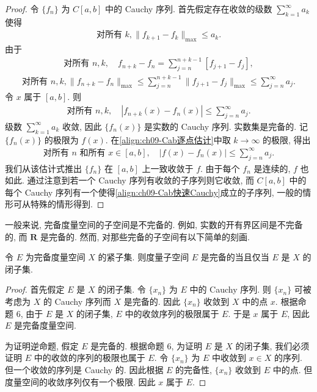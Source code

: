 \documentclass[../../main.tex]{subfiles}
\begin{document}
\begin{proof}
令 $\{f_{n}\}$ 为 $C[a,b]$ 中的 Cauchy 序列. 首先假定存在收敛的级数 $\sum_{k=1}^{\infty}a_{k}$ 使得
\begin{align}
\text{对所有 }k,\|f_{k+1}-f_{k}\|_{\max}\leqslant a_{k}.\label{align:ch09-Cab快速Cauchy}
\end{align}
由于
\begin{align*}
\text{对所有 }n,k,\quad f_{n+k}-f_{n}=\sum_{j=n}^{n+k-1}[f_{j+1}-f_{j}],
\end{align*}
\begin{align*}
\text{对所有 }n,k,\|f_{n+k}-f_{n}\|_{\max}\leqslant\sum_{j=n}^{n+k-1}\|f_{j+1}-f_{j}\|_{\max}\leqslant\sum_{j=n}^{\infty}a_{j}.
\end{align*}
令 $x$ 属于 $[a,b]$. 则
\begin{align}
\text{对所有 }n,k,\quad|f_{n+k}(x)-f_{n}(x)|\leqslant\sum_{j=n}^{\infty}a_{j}.\label{align:ch09-Cab逐点估计}
\end{align}
级数 $\sum_{k=1}^{\infty}a_{k}$ 收敛, 因此 $\{f_{n}(x)\}$ 是实数的 Cauchy 序列. 实数集是完备的. 记 $\{f_{n}(x)\}$ 的极限为 $f(x)$. 在\eqref{align:ch09-Cab逐点估计}中取 $k\to\infty$ 的极限, 得出
\begin{align*}
\text{对所有 }n\text{ 和所有 }x\in[a,b],\quad|f(x)-f_{n}(x)|\leqslant\sum_{j=n}^{\infty}a_{j}.
\end{align*}
我们从该估计式推出 $\{f_{n}\}$ 在 $[a,b]$ 上一致收敛于 $f$. 由于每个 $f_{n}$ 是连续的, $f$ 也如此. 通过注意到若一个 Cauchy 序列有收敛的子序列则它收敛, 而 $C[a,b]$ 中的每个 Cauchy 序列有一个使得\eqref{align:ch09-Cab快速Cauchy}成立的子序列, 一般的情形可从特殊的情形得到.
\end{proof}

一般来说, 完备度量空间的子空间是不完备的. 例如, 实数的开有界区间是不完备的, 而 $\mathbf{R}$ 是完备的. 然而, 对那些完备的子空间有以下简单的刻画.

\begin{proposition}\label{proposition:ch09-完备子空间闭集}
令 $E$ 为完备度量空间 $X$ 的紧子集. 则度量子空间 $E$ 是完备的当且仅当 $E$ 是 $X$ 的闭子集.
\end{proposition}

\begin{proof}
首先假定 $E$ 是 $X$ 的闭子集. 令 $\{x_{n}\}$ 为 $E$ 中的 Cauchy 序列. 则 $\{x_{n}\}$ 可被考虑为 $X$ 的 Cauchy 序列而 $X$ 是完备的. 因此 $\{x_{n}\}$ 收敛到 $X$ 中的点 $x$. 根据命题 6, 由于 $E$ 是 $X$ 的闭子集, $E$ 中的收敛序列的极限属于 $E$. 于是 $x$ 属于 $E$, 因此 $E$ 是完备度量空间.

为证明逆命题, 假定 $E$ 是完备的. 根据命题 6, 为证明 $E$ 是 $X$ 的闭子集, 我们必须证明 $E$ 中的收敛的序列的极限也属于 $E$. 令 $\{x_{n}\}$ 为 $E$ 中收敛到 $x\in X$ 的序列. 但一个收敛的序列是 Cauchy 的. 因此根据 $E$ 的完备性, $\{x_{n}\}$ 收敛到 $E$ 中的点. 但度量空间的收敛序列仅有一个极限. 因此 $x$ 属于 $E$.
\end{proof}
\end{document}
